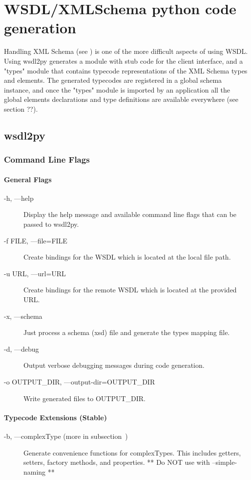 \chapter{WSDL/XMLSchema python code generation}

Handling XML Schema (see ) 
is one of the more difficult aspects of using WSDL.  
Using wsdl2py generates a module with stub code for the client interface,
and a "types" module that contains typecode representations of the XML Schema types and elements.  The generated typecodes are registered in a global schema instance, and once the "types" module is imported by an application all the global elements declarations and type definitions are available everywhere (see section ??).  

\section{wsdl2py}

\subsection{Command Line Flags}

\subsubsection{General Flags}
\begin{description}
\item[-h, ---help] Display the help message and available command line
flags that can be passed to wsdl2py.
\item[-f FILE, ---file=FILE] Create bindings for the WSDL which is located at
the local file path.
\item[-u URL, ---url=URL] Create bindings for the remote WSDL which is located
at the provided URL.
\item[-x, ---schema] Just process a schema (xsd) file and generate the types
mapping file.
\item[-d, ---debug] Output verbose debugging messages during code generation.
\item[-o OUTPUT_DIR, ---output-dir=OUTPUT_DIR] Write generated files to OUTPUT_DIR.
\end{description}

\subsubsection{Typecode Extensions (Stable) }
\begin{description}
\item[-b, ---complexType (more in subsection~\label{subsubsection:complexType})]
Generate convenience functions for complexTypes.  This includes getters,
setters, factory methods, and properties.  ** Do NOT use with --simple-naming **
\end{description}

